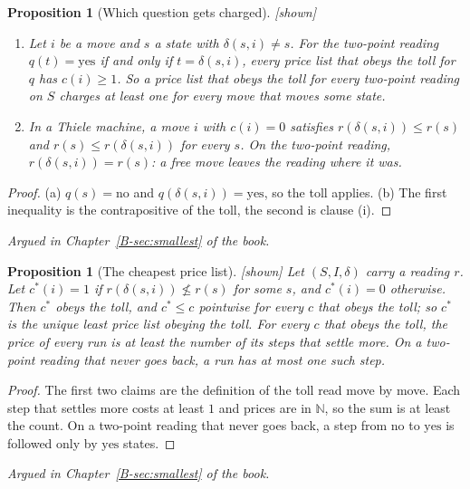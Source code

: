 \documentclass[11pt, a4paper]{article}
\theoremstyle{plain}
\newtheorem{proposition}[theorem]{Proposition}
\theoremstyle{definition}
\theoremstyle{remark}
\newcommand{\N}{\mathbb{N}}
\newcommand{\step}{\delta}
\newcommand{\cost}{c}
\newcommand{\rd}{r}
\newcommand{\argued}[1]{\par\noindent\textit{Argued in Chapter~\ref{B-#1} of the book.}\par}
\newcommand{\kind}[1]{\textup{[#1]}}
\begin{document}
\begin{proposition}[Which question gets charged]\label{spec:which-question} \kind{shown}
\begin{enumerate}[label=(\alph*)]
\item Let $i$ be a move and $s$ a state with $\step(s,i)\ne s$. For the two-point reading
$q(t)=\mathrm{yes}$ if and only if $t=\step(s,i)$, every price list that obeys the toll for $q$ has
$\cost(i)\ge1$. So a price list that obeys the toll for every two-point reading on $S$ charges at least
one for every move that moves some state.
\item In a Thiele machine, a move $i$ with $\cost(i)=0$ satisfies $\rd(\step(s,i))\le\rd(s)$ and
$\rd(s)\le\rd(\step(s,i))$ for every $s$. On the two-point reading, $\rd(\step(s,i))=\rd(s)$: a free
move leaves the reading where it was.
\end{enumerate}
\end{proposition}

\begin{proof}
(a) $q(s)=\mathrm{no}$ and $q(\step(s,i))=\mathrm{yes}$, so the toll applies. (b) The first inequality
is the contrapositive of the toll, the second is clause (i).
\end{proof}

\argued{sec:smallest}

\begin{proposition}[The cheapest price list]\label{spec:cheapest} \kind{shown}
Let $(S,I,\step)$ carry a reading $\rd$. Let $\cost^*(i)=1$ if $\rd(\step(s,i))\not\le\rd(s)$ for some
$s$, and $\cost^*(i)=0$ otherwise. Then $\cost^*$ obeys the toll, and $\cost^*\le\cost$ pointwise for
every $\cost$ that obeys the toll; so $\cost^*$ is the unique least price list obeying the toll. For
every $\cost$ that obeys the toll, the price of every run is at least the number of its steps that
settle more. On a two-point reading that never goes back, a run has at most one such step.
\end{proposition}

\begin{proof}
The first two claims are the definition of the toll read move by move. Each step that settles more
costs at least $1$ and prices are in $\N$, so the sum is at least the count. On a two-point reading that
never goes back, a step from $\mathrm{no}$ to $\mathrm{yes}$ is followed only by $\mathrm{yes}$ states.
\end{proof}

\argued{sec:smallest}
\end{document}
